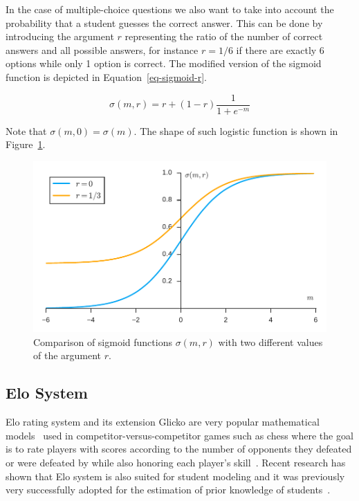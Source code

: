 In the case of multiple-choice questions we also want to take into account the probability that a student guesses the correct answer. This can be done by introducing the argument $r$ representing the ratio of the number of correct answers and all possible answers, for instance $r = 1/6$ if there are exactly 6 options while only 1 option is correct. The modified version of the sigmoid function is depicted in Equation~\ref{eq-sigmoid-r}.

\begin{equation} \label{eq-sigmoid-r}
  \sigma(m, r) = r + \left(1 - r\right)\frac{1}{1 + e^{-m}}
\end{equation}

Note that $\sigma(m, 0) = \sigma(m)$. The shape of such logistic function is shown in Figure~\ref{fig:sigmoid-function}.

\begin{figure}[htbp]
  \centering
  \includegraphics[width=\textwidth]{img/sigmoid-function}
  \caption{Comparison of sigmoid functions $\sigma(m, r)$ with two different values of the argument $r$.}
  \label{fig:sigmoid-function}
\end{figure}

\subsection{Elo System}
\label{elo}

Elo rating system and its extension Glicko are very popular mathematical models~\cite{rotou2015ranking} used in competitor-versus-competitor games such as chess where the goal is to rate players with scores according to the number of opponents they defeated or were defeated by while also honoring each player's skill~\cite{Vanek2014}. Recent research has shown that Elo system is also suited for student modeling and it was previously very successfully adopted for the estimation of prior knowledge of students~\cite{Niznan2015}.

